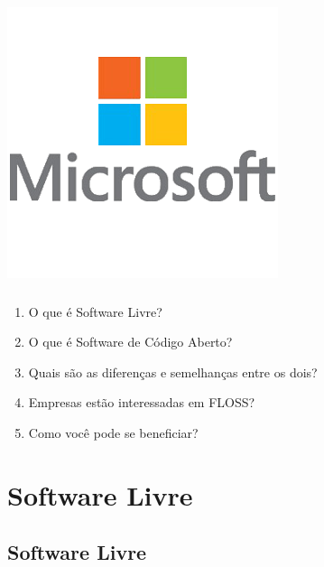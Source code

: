 \documentclass[xcolor=dvipsnames]{beamer}
\begin{document}
\begin{frame}
     \hspace{0.15cm}\includegraphics[scale=0.19]{microsoft.png}
\end{frame}

\begin{frame}
	\frametitle{}
	\begin{enumerate}
	\item O que é Software Livre?\vspace{0.2cm}
	\item O que é Software de Código Aberto?\vspace{0.2cm}
	\item Quais são as diferenças e semelhanças entre os dois?\vspace{0.2cm}
	\item Empresas estão interessadas em FLOSS?\vspace{0.2cm}
	\item Como você pode se beneficiar?
	\end{enumerate}
\end{frame}



\section{Software Livre}
\subsection{Software Livre}
\end{document}
